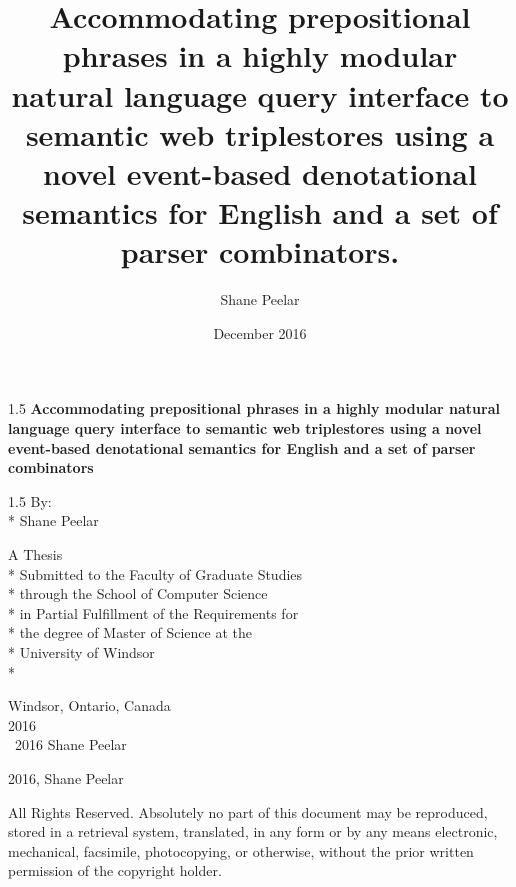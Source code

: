 \documentclass[oneside, 12pt]{book}
\author{Shane Peelar}
\title{Accommodating prepositional phrases in a highly modular
	natural language query interface to semantic web triplestores using a novel event-based denotational semantics for English and a set of parser combinators.}
\date{December 2016}
\newcommand{\uwinonehalfspacelen}{1.5}
\newenvironment{uwinonehalfspaceenv}%
{\begin{spacing}{\uwinonehalfspacelen}}%
	{\end{spacing}}
\begin{document}
	


\clearpage

\thispagestyle{empty}
\begin{center}
	\vspace*{1in}
	
	\begin{uwinonehalfspaceenv}
		\Large\textbf{Accommodating prepositional phrases in a highly modular
			natural language query interface to semantic web triplestores using a novel event-based denotational semantics for English and a set of parser combinators}
	\end{uwinonehalfspaceenv}
	
	\vspace{\fill} %
	\begin{uwinonehalfspaceenv}
		By:\\*
		Shane Peelar
	\end{uwinonehalfspaceenv}
	\vspace{\fill}
	
	\normalsize
	A Thesis \\*
	Submitted to the Faculty of Graduate Studies \\*
	through the School of Computer Science \\*
	in Partial Fulfillment of the Requirements for \\*
	the degree of Master of Science at the \\*
	University of Windsor \\*
	
	\vspace{1in}
	Windsor, Ontario, Canada \\
	\vspace{0.5cm}
	2016 \\
	\vspace{0.5cm}
	\textcopyright \  2016 Shane Peelar
\end{center}



\clearpage
\thispagestyle{empty}

\vspace*{\fill}

\noindent \textcopyright{} 2016, Shane Peelar

\vspace{2ex}

\noindent All Rights Reserved. Absolutely no part of this document may
be reproduced, stored in a retrieval system, translated, in any form
or by any means electronic, mechanical, facsimile, photocopying, or
otherwise, without the prior written permission of the copyright
holder.
\end{document}
